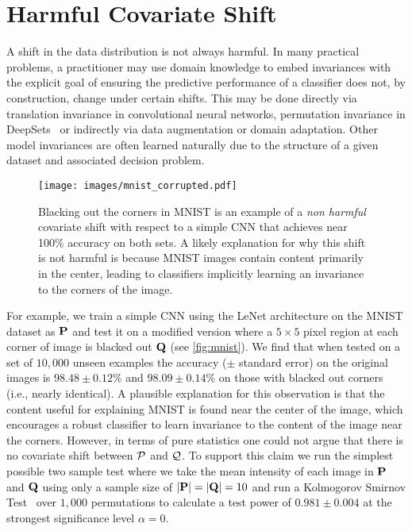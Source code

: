\section{Harmful Covariate Shift}\label{sec:harmful-covariate-shift} A shift in the data distribution is not always harmful.
In many practical problems, a practitioner may use domain knowledge to embed invariances with the explicit goal of ensuring the predictive performance of a classifier does not, by construction, change under certain shifts.
This may be done directly via translation invariance in convolutional neural networks, permutation invariance in DeepSets~\citep{deepsets} or indirectly via data augmentation or domain adaptation.
Other model invariances are often learned naturally due to the structure of a given dataset and associated decision problem.
\begin{wrapfigure}{r}{0.5\textwidth}
    \vspace{-6mm}
    \begin{center}
        \texttt{[image: images/mnist\_corrupted.pdf]}
    \end{center}
    \vspace{-4mm}
    \caption{\small Blacking out the corners in MNIST is an example of a \textit{non harmful} covariate shift with respect to a simple CNN that achieves near 100\% accuracy on both sets.
    A likely explanation for why this shift is not harmful is because MNIST images contain content primarily in the center, leading to classifiers implicitly learning an invariance to the corners
    of the image.}
    \label{fig:mnist}
    \vspace{-8mm}
\end{wrapfigure}
For example, we train a simple CNN using the LeNet architecture on the MNIST dataset as $\mathbf{P}$ and test it on a modified version where a $5\times 5$ pixel region at each corner of image is blacked out $\mathbf{Q}$ (see \autoref{fig:mnist}).
We find that when tested on a set of $10,000$ unseen examples the accuracy ($\pm$ standard error) on the original images is $98.48\pm 0.12 \%$ and $98.09\pm 0.14 \%$ on those with blacked out corners (i.e., nearly identical).
A plausible explanation for this observation is that the content useful for explaining MNIST is found near the center of the image,
which encourages a robust classifier to learn invariance to the content of the image near the corners.
However, in terms of pure statistics one could not argue that there is no covariate shift between $\mathcal{P}$ and $\mathcal{Q}$.
To support this claim we run the simplest possible two sample test where we take the mean intensity of each image in $\mathbf{P}$ and $\mathbf{Q}$ using only a sample size of $|\mathbf{P}|=|\mathbf{Q}|=10$ and
run a Kolmogorov Smirnov Test~\citep{kstest} over $1,000$ permutations to calculate a test power of $0.981\pm 0.004$ at the strongest significance level $\alpha=0$.

